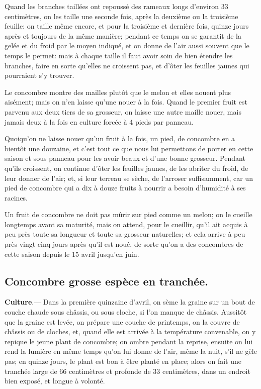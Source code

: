 \documentclass[10pt,a4paper]{book}
\begin{document}
Quand les branches taillées ont repoussé des rameaux longs d'environ 33 centimètres, on les taille une seconde fois, après la deuxième ou la troisième feuille: on taille même encore, et pour la troisième et dernière fois, quinze jours après et toujours de la même manière; pendant ce temps on se garantit de la gelée et du froid par le moyen indiqué, et on donne de l'air aussi souvent que le temps le permet: mais à chaque taille il faut avoir soin de bien étendre les branches, faire en sorte qu'elles ne croissent pas, et d’ôter les feuilles jaunes qui pourraient s'y trouver.

Le concombre montre des mailles plutôt que le melon et elles nouent plus aisément; mais on n'en laisse qu'une nouer à la fois. Quand le premier fruit est parvenu aux deux tiers de sa grosseur, on laisse une autre maille nouer, mais jamais deux à la fois en culture forcée à 4 pieds par panneau.

Quoiqu'on ne laisse nouer qu'un fruit à la fois, un pied, de concombre en a bientôt une douzaine, et c'est tout ce que nous lui permettons de porter en cette saison et sous panneau pour les avoir beaux et d'une bonne grosseur. Pendant qu'ils croissent, on continue d'ôter les feuilles jaunes, de les abriter du froid, de leur donner de l'air; et, si leur terreau se sèche, de l'arroser suffisamment, car un pied de concombre qui a dix à douze fruits à nourrir a besoin d’humidité à ses racines.

Un fruit de concombre ne doit pas mûrir sur pied comme un melon; on le cueille longtemps avant sa maturité, mais on attend, pour le cueillir, qu'il ait acquis à peu près toute sa longueur et toute sa grosseur naturelles; et cela arrive à peu près vingt cinq jours après qu'il est noué, de sorte qu'on a des concombres de cette saison depuis le 15 avril jusqu'en juin.

\subsection{Concombre grosse espèce en tranchée.}

\textbf{Culture}.--- Dans la première quinzaine d'avril, on sème la graine sur un bout de couche chaude sous châssis, ou sous cloche, si l'on manque de châssis. Aussitôt que la graine est levée, on prépare une couche de printemps, on la couvre de châssis ou de cloches, et, quand elle est arrivée à la température convenable, on y repique le jeune plant de concombre; on ombre pendant la reprise, ensuite on lui rend la lumière en même temps qu'on lui donne de l'air, même la nuit, s'il ne gèle pas; en quinze jours, le plant est bon à être planté en place; alors on fait une tranchée large de 66 centimètres et profonde de 33 centimètres, dans un endroit bien exposé, et longue à volonté.
\end{document}
